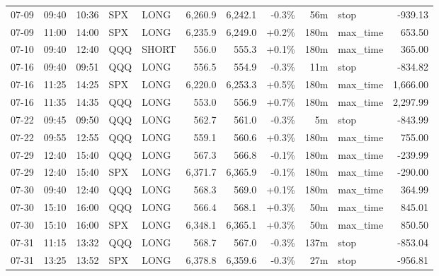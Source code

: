 \documentclass[11pt,a4paper,twoside]{article}
\begin{document}
\begin{center}
\begin{longtable}{>{\color{txtmain}}l l l l l r r r r >{\color{txtmain}}l r}
07-09 & 09:40 & 10:36 & SPX & LONG & 6,260.9 & 6,242.1 & \textcolor{lossred}{-0.3\%} & 56m & stop & \textcolor{lossred}{-939.13} \\
07-09 & 11:00 & 14:00 & SPX & LONG & 6,235.9 & 6,249.0 & \textcolor{wingreen}{+0.2\%} & 180m & max\_time & \textcolor{wingreen}{653.50} \\
07-10 & 09:40 & 12:40 & QQQ & SHORT & 556.0 & 555.3 & \textcolor{wingreen}{+0.1\%} & 180m & max\_time & \textcolor{wingreen}{365.00} \\
07-16 & 09:40 & 09:51 & QQQ & LONG & 556.5 & 554.9 & \textcolor{lossred}{-0.3\%} & 11m & stop & \textcolor{lossred}{-834.82} \\
07-16 & 11:25 & 14:25 & SPX & LONG & 6,220.0 & 6,253.3 & \textcolor{wingreen}{+0.5\%} & 180m & max\_time & \textcolor{wingreen}{1,666.00} \\
07-16 & 11:35 & 14:35 & QQQ & LONG & 553.0 & 556.9 & \textcolor{wingreen}{+0.7\%} & 180m & max\_time & \textcolor{wingreen}{2,297.99} \\
07-22 & 09:45 & 09:50 & QQQ & LONG & 562.7 & 561.0 & \textcolor{lossred}{-0.3\%} & 5m & stop & \textcolor{lossred}{-843.99} \\
07-22 & 09:55 & 12:55 & QQQ & LONG & 559.1 & 560.6 & \textcolor{wingreen}{+0.3\%} & 180m & max\_time & \textcolor{wingreen}{755.00} \\
07-29 & 12:40 & 15:40 & QQQ & LONG & 567.3 & 566.8 & \textcolor{lossred}{-0.1\%} & 180m & max\_time & \textcolor{lossred}{-239.99} \\
07-29 & 12:40 & 15:40 & SPX & LONG & 6,371.7 & 6,365.9 & \textcolor{lossred}{-0.1\%} & 180m & max\_time & \textcolor{lossred}{-290.00} \\
07-30 & 09:40 & 12:40 & QQQ & LONG & 568.3 & 569.0 & \textcolor{wingreen}{+0.1\%} & 180m & max\_time & \textcolor{wingreen}{364.99} \\
07-30 & 15:10 & 16:00 & QQQ & LONG & 566.4 & 568.1 & \textcolor{wingreen}{+0.3\%} & 50m & max\_time & \textcolor{wingreen}{845.01} \\
07-30 & 15:10 & 16:00 & SPX & LONG & 6,348.1 & 6,365.1 & \textcolor{wingreen}{+0.3\%} & 50m & max\_time & \textcolor{wingreen}{850.50} \\
07-31 & 11:15 & 13:32 & QQQ & LONG & 568.7 & 567.0 & \textcolor{lossred}{-0.3\%} & 137m & stop & \textcolor{lossred}{-853.04} \\
07-31 & 13:25 & 13:52 & SPX & LONG & 6,378.8 & 6,359.6 & \textcolor{lossred}{-0.3\%} & 27m & stop & \textcolor{lossred}{-956.81} \\

\end{longtable}
\end{center}
\end{document}

